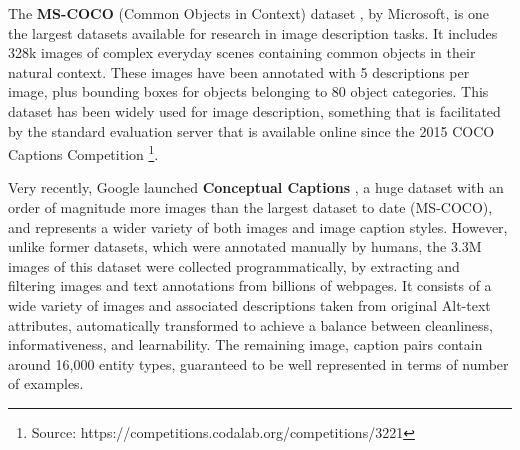 The \textbf{MS-COCO} (Common Objects in Context) dataset \citep{Lin2014}, by Microsoft, is one the largest datasets available for research in image description tasks. It includes 328k images of complex everyday scenes containing common objects in their natural context.  These images have been annotated with 5 descriptions per image, plus bounding boxes for objects belonging to 80 object categories. This dataset has been widely used for image description, something that is facilitated by the standard evaluation server that is available online since the 2015 COCO Captions Competition \footnote{Source: https://competitions.codalab.org/competitions/3221}. 

Very recently, Google launched \textbf{Conceptual Captions} \citep{Sharma2018}, a huge dataset with an order of magnitude more images than the largest dataset to date (MS-COCO), and represents a wider variety of both images and image caption styles. However, unlike former datasets, which were annotated manually by humans, the 3.3M images of this dataset were collected programmatically, by extracting and filtering images and text annotations from billions of webpages. It consists of a wide variety of images and associated descriptions taken from original Alt-text attributes, automatically transformed to achieve a balance between cleanliness, informativeness, and learnability. The remaining image, caption pairs contain around 16,000 entity types, guaranteed to be well represented in terms of number of examples.

